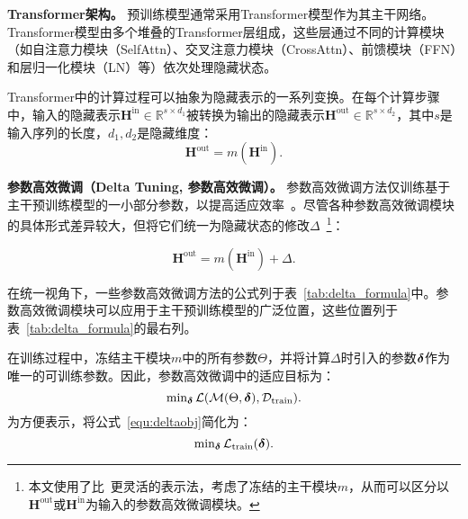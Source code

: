 \textbf{Transformer架构。} 预训练模型通常采用Transformer模型作为其主干网络。Transformer模型由多个堆叠的Transformer层组成，这些层通过不同的计算模块（如自注意力模块（SelfAttn）、交叉注意力模块（CrossAttn）、前馈模块（FFN）和层归一化模块（LN）等）依次处理隐藏状态。

Transformer中的计算过程可以抽象为隐藏表示的一系列变换。在每个计算步骤中，输入的隐藏表示$\mathbf{H}^{\text{in}}\in \mathbb{R}^{s\times d_1}$被转换为输出的隐藏表示$\mathbf{H}^{\text{out}}\in \mathbb{R}^{s\times d_2}$，其中$s$是输入序列的长度，$d_1, d_2$是隐藏维度：
\begin{equation}
    \mathbf{H}^{\text{out}} = m(\mathbf{H}^{\text{in}}).
\end{equation}

\noindent\textbf{参数高效微调（Delta Tuning, 参数高效微调）。}\label{sec:meth:delta}
参数高效微调方法仅训练基于主干预训练模型的一小部分参数，以提高适应效率~\cite{houlsby2019parameter, pfeiffer2020adapterfusion, zaken2021bitfit, hu2021lora, mahabadi2021compacter,guo2021parameter,li2021prefix,lester2021power}。尽管各种参数高效微调模块的具体形式差异较大，但\citet{he2022unified}将它们统一为隐藏状态的修改$\Delta$~\footnote{本文使用了比~\cite{he2022unified}更灵活的表示法，考虑了冻结的主干模块$m$，从而可以区分以$\mathbf{H}^{\text{out}}$或$\mathbf{H}^{\text{in}}$为输入的参数高效微调模块。}：

\begin{equation}
\label{equ:unifydelta}
    \mathbf{H}^{\text{out}} = m(\mathbf{H}^{\text{in}}) + \Delta.
\end{equation}

在统一视角下，一些参数高效微调方法的公式列于表~\ref{tab:delta_formula}中。参数高效微调模块可以应用于主干预训练模型的广泛位置，这些位置列于表~\ref{tab:delta_formula}的最右列。

在训练过程中，冻结主干模块$m$中的所有参数$\Theta$，并将计算$\Delta$时引入的参数$\boldsymbol{\delta}$作为唯一的可训练参数。因此，参数高效微调中的适应目标为：
\begin{equation}
    \operatorname{min}_{\boldsymbol{\delta}} \mathcal{L}(\mathcal{M}(\Theta, \boldsymbol{\delta}), \mathcal{D}_{\text{train}}). 
\label{equ:deltaobj}
\end{equation}
为方便表示，将公式~\eqref{equ:deltaobj}简化为：
\begin{equation}
        \operatorname{min}_{\boldsymbol{\delta}} \mathcal{L}_{\text{train}}( \boldsymbol{\delta}).
\end{equation}


